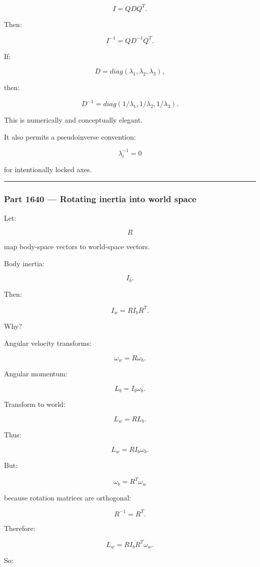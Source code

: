\[
I=QDQ^T.
\]

Then:

\[
I^{-1}
=
QD^{-1}Q^T.
\]

If:

\[
D=
diag(\lambda_1,\lambda_2,\lambda_3),
\]

then:

\[
D^{-1}
=
diag(
1/\lambda_1,
1/\lambda_2,
1/\lambda_3
).
\]

This is numerically and conceptually elegant.

It also permits a pseudoinverse convention:

\[
\lambda_i^{-1}=0
\]

for intentionally locked axes.

\begin{center}\rule{0.5\linewidth}{0.5pt}\end{center}

\subsubsection{Part 1640 --- Rotating inertia into world space}\label{part-1640-rotating-inertia-into-world-space}

Let:

\[
R
\]

map body-space vectors to world-space vectors.

Body inertia:

\[
I_b.
\]

Then:

\[
\boxed{
I_w
=
RI_bR^T.
}
\]

Why?

Angular velocity transforms:

\[
\omega_w=
R\omega_b.
\]

Angular momentum:

\[
L_b=
I_b\omega_b.
\]

Transform to world:

\[
L_w=
RL_b.
\]

Thus:

\[
L_w=
RI_b\omega_b.
\]

But:

\[
\omega_b=
R^T\omega_w
\]

because rotation matrices are orthogonal:

\[
R^{-1}=R^T.
\]

Therefore:

\[
L_w=
RI_bR^T\omega_w.
\]

So:

